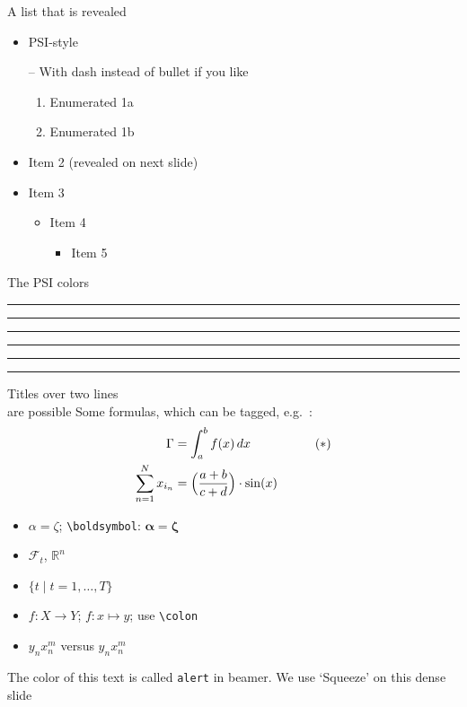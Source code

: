 \documentclass[aspectratio=169,xcolor=table,t]{beamer}
\begin{document}
\begin{frame}{A list that is revealed}

  \begin{itemize}
  \item PSI-style 
  \item[--]  With dash instead of bullet if you like
    \begin{enumerate}
    \item Enumerated 1a
    \item Enumerated 1b
    \end{enumerate}
    \pause
  \item Item 2 (revealed on next slide)
    \pause
  \item Item 3
    \begin{itemize}
    \item Item 4
      \begin{itemize}
      \item Item 5
      \end{itemize}
    \end{itemize}
  \end{itemize}

\end{frame}



\begin{frame}{The PSI colors}

\textcolor{PSIgreen}{\rule{2cm}{1cm}}
\textcolor{PSIyellow}{\rule{2cm}{1cm}}
\textcolor{PSIpink}{\rule{2cm}{1cm}}
\textcolor{PSIblue}{\rule{2cm}{1cm}}
\textcolor{PSIred}{\rule{2cm}{1cm}}
\textcolor{PSIviolet}{\rule{2cm}{1cm}}


\end{frame}

\begin{frame}[squeeze]{Titles over two lines\\ are possible}
  Some formulas, which can be tagged, e.g.\ \thetag{$\ast$}:
  \begin{align*}
    \Gamma  & = \int_a^b f(x)\,dx             && \tag{$\ast$}\\
    \sum_{n=1}^N x_{i_n} &= \Bigl(\frac{a+b}{c+d}\Bigr)\cdot \sin(x)  &&
  \end{align*}
  \begin{itemize}
  \item  $\alpha = \zeta$; \texttt{\textbackslash boldsymbol}: $\boldsymbol{\alpha} = \boldsymbol{\zeta}$ 
  \item $\mathcal{F}_t$, $\mathbb{R}^n$
  \item $\{t \mid t=1,\dots,T\}$
  \item $f\colon X\to Y$; $f\colon x\mapsto y$; use \texttt{\textbackslash colon}
  \item $y_nx_n^m$ versus $y_n^{}x_n^m$
  \end{itemize}
   \alert{The color of this text is called \texttt{alert} in beamer. We use `Squeeze' on this dense slide}
  
\end{frame}
\end{document}
